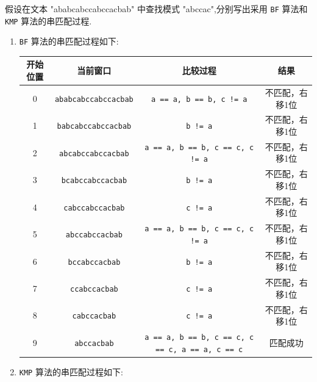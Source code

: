 \documentclass[../../main.tex]{subfiles}
\begin{document}
\begin{problem}
假设在文本 "ababcabccabccacbab" 中查找模式 "abccac",分别写出采用 \texttt{BF} 算法和 \texttt{KMP} 算法的串匹配过程.
\end{problem}

\begin{solution}
    \begin{enumerate}
        \item \texttt{BF} 算法的串匹配过程如下:
              \begin{longtable}{|c|c|c|c|}
                  \hline
                  \textbf{开始位置} & \textbf{当前窗口}               & \textbf{比较过程}                                           & \textbf{结果} \\
                  \hline
                  0             & \texttt{ababcabccabccacbab} & \texttt{a == a, b == b, c != a}                         & 不匹配，右移1位    \\
                  \hline
                  1             & \texttt{babcabccabccacbab}  & \texttt{b != a}                                         & 不匹配，右移1位    \\
                  \hline
                  2             & \texttt{abcabccabccacbab}   & \texttt{a == a, b == b, c == c, c != a}                 & 不匹配，右移1位    \\
                  \hline
                  3             & \texttt{bcabccabccacbab}    & \texttt{b != a}                                         & 不匹配，右移1位    \\
                  \hline
                  4             & \texttt{cabccabccacbab}     & \texttt{c != a}                                         & 不匹配，右移1位    \\
                  \hline
                  5             & \texttt{abccabccacbab}      & \texttt{a == a, b == b, c == c, c != a}                 & 不匹配，右移1位    \\
                  \hline
                  6             & \texttt{bccabccacbab}       & \texttt{b != a}                                         & 不匹配，右移1位    \\
                  \hline
                  7             & \texttt{ccabccacbab}        & \texttt{c != a}                                         & 不匹配，右移1位    \\
                  \hline
                  8             & \texttt{cabccacbab}         & \texttt{c != a}                                         & 不匹配，右移1位    \\
                  \hline
                  9             & \texttt{abccacbab}          & \texttt{a == a, b == b, c == c, c == c, a == a, c == c} & 匹配成功        \\
                  \hline
              \end{longtable}
        \item \texttt{KMP} 算法的串匹配过程如下:


\end{enumerate}
\end{solution}
\end{document}
